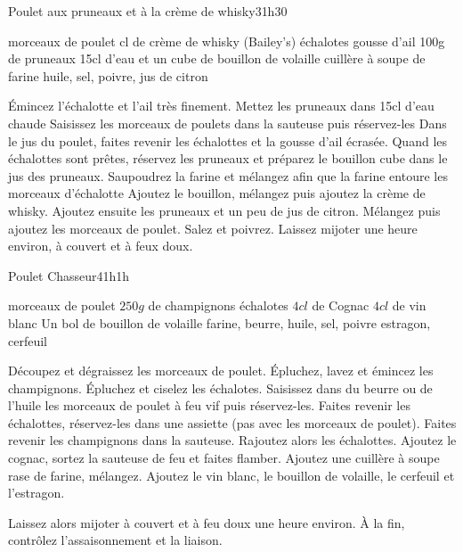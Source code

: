 \begin{recette}{Poulet aux pruneaux et à la crème de whisky}{3}{1h30}{}
\begin{ingredients}
 morceaux de poulet
 cl de crème de whisky (Bailey's)
 échalotes
 gousse d'ail
\ingredient 100g de pruneaux
\ingredient 15cl d'eau et un cube de bouillon de volaille
 cuillère à soupe de farine
\ingredient huile, sel, poivre, jus de citron
\end{ingredients}

\begin{preparation}
\etape Émincez l'échalotte et l'ail très finement. Mettez les pruneaux dans 15cl d'eau chaude
\etape Saisissez les morceaux de poulets dans la sauteuse puis réservez-les
\etape Dans le jus du poulet, faites revenir les échalottes et la gousse d'ail écrasée.
\etape Quand les échalottes sont prêtes, réservez les pruneaux et préparez le bouillon cube dans le jus des pruneaux. Saupoudrez la farine et mélangez afin que la farine entoure les morceaux d'échalotte
\etape Ajoutez le bouillon, mélangez puis ajoutez la crème de whisky. Ajoutez ensuite les pruneaux et un peu de jus de citron. Mélangez puis ajoutez les morceaux de poulet. Salez et poivrez.
\etape Laissez mijoter une heure environ, à couvert et à feux doux.
\end{preparation}

\end{recette}

\begin{recette}{Poulet Chasseur}{4}{1h}{1h}
\begin{ingredients}
 morceaux de poulet
\ingredient $250\unit{g}$ de champignons
 échalotes
\ingredient $4\unit{cl}$ de Cognac
\ingredient $4\unit{cl}$ de vin blanc
\ingredient Un bol de bouillon de volaille
\ingredient farine, beurre, huile, sel, poivre
\ingredient estragon, cerfeuil
\end{ingredients}


\begin{preparation}
\etape Découpez et dégraissez les morceaux de poulet. 
\etape Épluchez, lavez et émincez les champignons. Épluchez et ciselez les échalotes.
\etape Saisissez dans du beurre ou de l'huile les morceaux de poulet à feu vif puis réservez-les.
\etape Faites revenir les échalottes, réservez-les dans une assiette (pas avec les morceaux de poulet).
\etape Faites revenir les champignons dans la sauteuse. 
\etape Rajoutez alors les échalottes. Ajoutez le cognac, sortez la sauteuse de feu et faites flamber. 
\etape Ajoutez une cuillère à soupe rase de farine, mélangez.
\etape Ajoutez le vin blanc, le bouillon de volaille, le cerfeuil et l'estragon. 
\end{preparation}

\begin{cuisson}
Laissez alors mijoter à couvert et à feu doux une heure environ. À la fin, contrôlez l'assaisonnement et la liaison.
\end{cuisson}
\end{recette}

